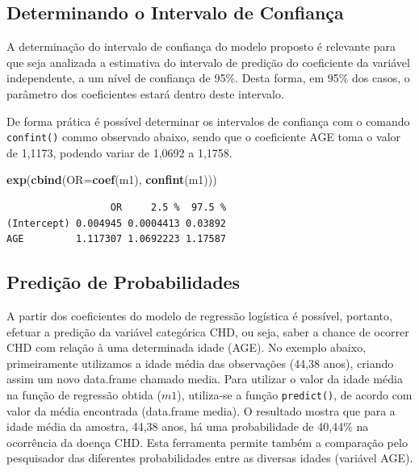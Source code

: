 \documentclass[12pt,brazil,oneside]{book}
\newenvironment{Shaded}{\begin{snugshade}}{\end{snugshade}}
\newcommand{\DataTypeTok}[1]{\textcolor[rgb]{0.13,0.29,0.53}{#1}}
\newcommand{\KeywordTok}[1]{\textcolor[rgb]{0.13,0.29,0.53}{\textbf{#1}}}
\newcommand{\NormalTok}[1]{#1}
\begin{document}
\hypertarget{determinando-o-intervalo-de-confianca}{%
\subsection{Determinando o Intervalo de Confiança}\label{determinando-o-intervalo-de-confianca}}

A determinação do intervalo de confiança do modelo proposto é relevante para que seja analizada a estimativa do intervalo de predição do coeficiente da variável independente, a um nível de confiança de 95\%. Desta forma, em 95\% dos casos, o parâmetro dos coeficientes estará dentro deste intervalo.

De forma prática é possível determinar os intervalos de confiança com o comando \texttt{confint()} commo observado abaixo, sendo que o coeficiente AGE toma o valor de 1,1173, podendo variar de 1,0692 a 1,1758.

\begin{Shaded}
\begin{Highlighting}[]
\KeywordTok{exp}\NormalTok{(}\KeywordTok{cbind}\NormalTok{(}\DataTypeTok{OR=}\KeywordTok{coef}\NormalTok{(m1), }\KeywordTok{confint}\NormalTok{(m1)))}
\end{Highlighting}
\end{Shaded}

\begin{verbatim}
                  OR     2.5 %  97.5 %
(Intercept) 0.004945 0.0004413 0.03892
AGE         1.117307 1.0692223 1.17587
\end{verbatim}

\hypertarget{predicao-de-probabilidades}{%
\subsection{Predição de Probabilidades}\label{predicao-de-probabilidades}}

A partir dos coeficientes do modelo de regressão logística é possível, portanto, efetuar a predição da variável categórica CHD, ou seja, saber a chance de ocorrer CHD com relação à uma determinada idade (AGE). No exemplo abaixo, primeiramente utilizamos a idade média das observações (44,38 anos), criando assim um novo data.frame chamado media. Para utilizar o valor da idade média na função de regressão obtida (\(m1\)), utiliza-se a função \texttt{predict()}, de acordo com valor da média encontrada (data.frame media). O resultado mostra que para a idade média da amostra, 44,38 anos, há uma probabilidade de 40,44\% na ocorrência da doença CHD. Esta ferramenta permite também a comparação pelo pesquisador das diferentes probabilidades entre as diversas idades (variável AGE).
\end{document}
